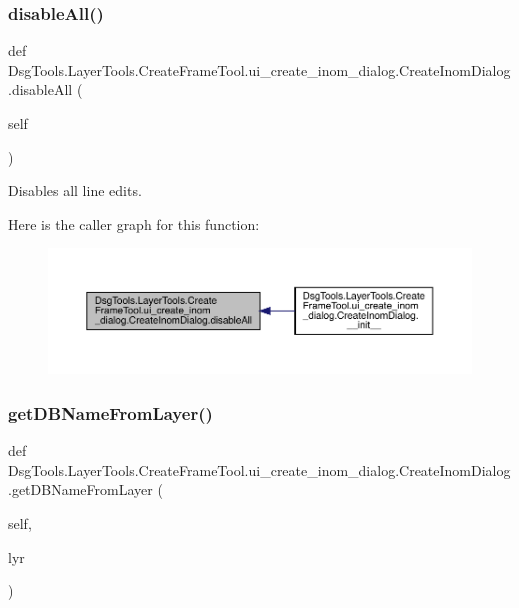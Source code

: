 \subsubsection{\texorpdfstring{disable\+All()}{disableAll()}}
{\footnotesize\ttfamily def Dsg\+Tools.\+Layer\+Tools.\+Create\+Frame\+Tool.\+ui\+\_\+create\+\_\+inom\+\_\+dialog.\+Create\+Inom\+Dialog.\+disable\+All (\begin{DoxyParamCaption}\item[{}]{self }\end{DoxyParamCaption})}

\begin{DoxyVerb}Disables all line edits.
\end{DoxyVerb}
 Here is the caller graph for this function\+:
\nopagebreak
\begin{figure}[H]
\begin{center}
\leavevmode
\includegraphics[width=350pt]{class_dsg_tools_1_1_layer_tools_1_1_create_frame_tool_1_1ui__create__inom__dialog_1_1_create_inom_dialog_a1b5c2fa4b6b19f3877ccaf9f2f42a43b_icgraph}
\end{center}
\end{figure}
\mbox{\label{class_dsg_tools_1_1_layer_tools_1_1_create_frame_tool_1_1ui__create__inom__dialog_1_1_create_inom_dialog_a6d64367cb126c7e4db21eb563ab9e723}} 
\subsubsection{\texorpdfstring{get\+D\+B\+Name\+From\+Layer()}{getDBNameFromLayer()}}
{\footnotesize\ttfamily def Dsg\+Tools.\+Layer\+Tools.\+Create\+Frame\+Tool.\+ui\+\_\+create\+\_\+inom\+\_\+dialog.\+Create\+Inom\+Dialog.\+get\+D\+B\+Name\+From\+Layer (\begin{DoxyParamCaption}\item[{}]{self,  }\item[{}]{lyr }\end{DoxyParamCaption})}

